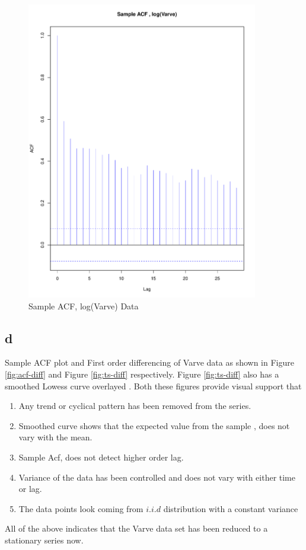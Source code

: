\documentclass{article}
\begin{document}
\begin{figure}
	\centering
	\includegraphics[width=0.9\textwidth]{SampleACF-lVarve}
	\caption{Sample ACF, log(Varve) Data }
	\label{fig:acf}
\end{figure}

\newpage
\subsection{d}

Sample ACF plot and First order differencing of Varve data as shown in Figure \ref{fig:acf-diff} and Figure \ref{fig:ts-diff} respectively. Figure \ref{fig:ts-diff} also has a smoothed Lowess curve overlayed . Both these figures provide visual support that
\begin{enumerate}
	\item  Any trend or cyclical pattern has been removed from the series.
	\item  Smoothed curve shows that the expected value from the sample , does not vary with the mean.
	\item  Sample Acf, does not detect higher order lag. 
	\item  Variance of the data has been controlled and does not vary with either time or lag. 
	\item  The data points look coming from $i.i.d$ distribution with a constant variance
	
\end{enumerate}
All of the above indicates that the Varve data set has been reduced to a stationary series now.
\end{document}
